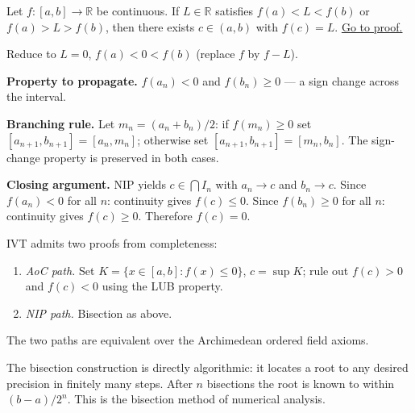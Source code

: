 \begin{proposition}
\label{prop:ivt-bisection}
Let $f:[a,b]\to\mathbb{R}$ be continuous. If $L\in\mathbb{R}$ satisfies
$f(a)<L<f(b)$ or $f(a)>L>f(b)$, then there exists $c\in(a,b)$ with
$f(c)=L$.
\hyperref[prf:ivt-bisection]{Go to proof.}
\end{proposition}

\begin{remark*}
\end{remark*}


\begin{remark}
Reduce to $L=0$, $f(a)<0<f(b)$ (replace $f$ by $f-L$).

\medskip
\noindent\textbf{Property to propagate.}
$f(a_n)<0$ and $f(b_n)\geq 0$ — a sign change across the interval.

\noindent\textbf{Branching rule.}
Let $m_n=(a_n+b_n)/2$: if $f(m_n)\geq 0$ set $[a_{n+1},b_{n+1}]=[a_n,m_n]$;
otherwise set $[a_{n+1},b_{n+1}]=[m_n,b_n]$. The sign-change property is
preserved in both cases.

\noindent\textbf{Closing argument.}
NIP yields $c\in\bigcap I_n$ with $a_n\to c$ and $b_n\to c$.
Since $f(a_n)<0$ for all $n$: continuity gives $f(c)\leq 0$.
Since $f(b_n)\geq 0$ for all $n$: continuity gives $f(c)\geq 0$.
Therefore $f(c)=0$.
\end{remark}

\begin{remark}
IVT admits two proofs from completeness:
\begin{enumerate}
  \item \emph{AoC path.} Set $K=\{x\in[a,b]:f(x)\leq 0\}$, $c=\sup K$;
        rule out $f(c)>0$ and $f(c)<0$ using the LUB property.
  \item \emph{NIP path.} Bisection as above.
\end{enumerate}
The two paths are equivalent over the Archimedean ordered field axioms.
\end{remark}

\begin{remark}
The bisection construction is directly algorithmic: it locates a root to
any desired precision in finitely many steps. After $n$ bisections the
root is known to within $(b-a)/2^n$. This is the bisection method of
numerical analysis.
\end{remark}

